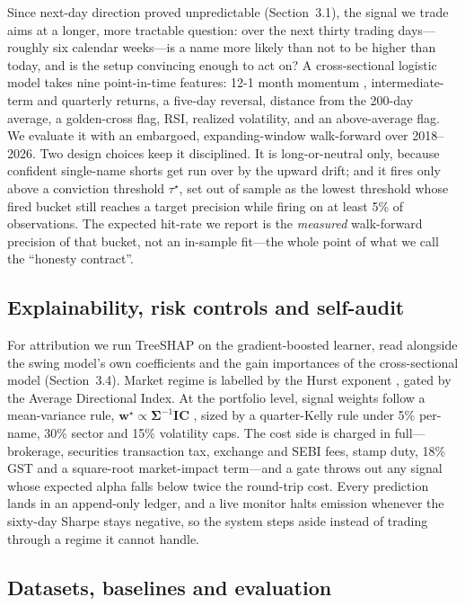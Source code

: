 \documentclass[12pt,a4paper]{article}
\begin{document}
Since next-day direction proved unpredictable (Section~3.1), the signal we trade
aims at a longer, more tractable question: over the next thirty trading
days---roughly six calendar weeks---is a name more likely than not to be higher
than today, and is the setup convincing enough to act on? A cross-sectional
logistic model takes nine point-in-time features: 12-1 month
momentum \cite{r_jt}, intermediate-term and quarterly returns, a five-day reversal,
distance from the 200-day average, a golden-cross flag, RSI, realized volatility,
and an above-average flag. We evaluate it with an embargoed, expanding-window
walk-forward over 2018--2026. Two design choices keep it disciplined. It is
long-or-neutral only, because confident single-name shorts get run over by the
upward drift; and it fires only above a conviction threshold $\tau^{\star}$, set
out of sample as the lowest threshold whose fired bucket still reaches a target
precision while firing on at least 5\% of observations. The expected hit-rate we
report is the \emph{measured} walk-forward precision of that bucket, not an
in-sample fit---the whole point of what we call the ``honesty contract''.

\subsection{Explainability, risk controls and self-audit}

For attribution we run TreeSHAP \cite{r_lundberg} on the gradient-boosted learner,
read alongside the swing model's own coefficients and the gain importances of the
cross-sectional model (Section~3.4). Market regime is labelled by the Hurst
exponent \cite{r_hurst}, gated by the Average Directional Index. At the portfolio
level, signal weights follow a mean-variance rule,
$\mathbf w^{\star}\propto\boldsymbol\Sigma^{-1}\mathbf{IC}$ \cite{r_grinold}, sized
by a quarter-Kelly rule \cite{r_kelly} under 5\% per-name, 30\% sector and 15\%
volatility caps. The cost side is charged in full---brokerage, securities
transaction tax, exchange and SEBI fees, stamp duty, 18\% GST and a square-root
market-impact term---and a gate throws out any signal whose expected alpha falls
below twice the round-trip cost. Every prediction lands in an append-only ledger,
and a live monitor halts emission whenever the sixty-day Sharpe stays negative, so
the system steps aside instead of trading through a regime it cannot handle.

\subsection{Datasets, baselines and evaluation}
\end{document}
